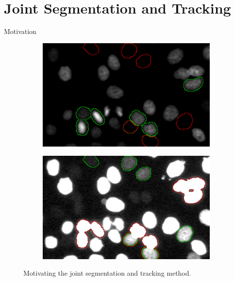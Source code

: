 \section{Joint Segmentation and Tracking}

\begin{frame}{Motivation}
    \begin{figure}
    \centering
    \begin{subfigure}[t]{0.48\textwidth}
        \includegraphics[width=\textwidth]{images/joint/mitocheck_255_max.pdf}
        \caption{}
        \label{fig:joint-underseg-no-detection}
    \end{subfigure}
    \hfill
    \begin{subfigure}[t]{0.48\textwidth}
        \includegraphics[width=\textwidth]{images/joint/mitocheck_030_max.pdf}
        \caption{}
        \label{fig:joint-underseg-mergers}
    \end{subfigure}
    \caption{Motivating the joint segmentation and tracking method.}
    \label{fig:joint-motivation-example}
\end{figure}
\end{frame}

